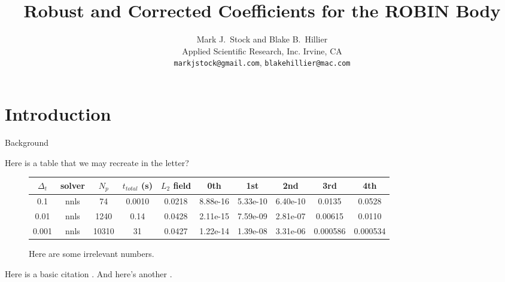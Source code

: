 \documentclass[12pt]{article}
\title{Robust and Corrected Coefficients for the ROBIN Body}
\author{Mark J.~Stock and Blake B.~Hillier\\
        Applied Scientific Research, Inc.
        Irvine, CA\\
        \texttt{markjstock@gmail.com}, \texttt{blakehillier@mac.com}
}
\begin{document}
\maketitle



\section{Introduction}
Background

Here is a table that we may recreate in the letter?

\begin{figure} \begin{centering}
\begin{small}
\begin{tabular}{cccccccccc}
$\Delta_t$ & solver & $N_p$ & $t_{total}$ (s) & $L_2$ field & 0th & 1st & 2nd & 3rd & 4th \\
\hline
0.1 & nnls & 74 & 0.0010 & 0.0218 & 8.88e-16 & 5.33e-10 & 6.40e-10 & 0.0135 & 0.0528 \\
\hline
0.01 & nnls & 1240 & 0.14 & 0.0428 & 2.11e-15 & 7.59e-09 & 2.81e-07 & 0.00615 & 0.0110 \\
\hline
0.001 & nnls & 10310 & 31 & 0.0427 & 1.22e-14 & 1.39e-08 & 3.31e-06 & 0.000586 & 0.000534 \\
\end{tabular}
\caption{Here are some irrelevant numbers. }
\label{solverres}
\end{small}
\end{centering}\end{figure}%

Here is a basic citation \cite{stock11a}. And here's another \cite{robinsurfmesh}.




\end{document}
